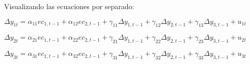 \documentclass[10pt, a4paper, landscape]{article}
\begin{document}
\begin{multicols}{2}
		Visualizando las ecuaciones por separado:
		
		\begin{center}
			$\Delta y_{1t} = \alpha_{11} ec_{1, t - 1} + \alpha_{12} ec_{2, t - 1}  + \gamma_{11} \Delta y_{1, t - 1} + \gamma_{12} \Delta y_{2, t - 1} + \gamma_{13} \Delta y_{3, t - 1} + u_{1t}$
			
			$\Delta y_{2t} = \alpha_{21} ec_{1, t - 1} + \alpha_{22} ec_{2, t - 1}  + \gamma_{21} \Delta y_{1, t - 1} + \gamma_{22} \Delta y_{2, t - 1} + \gamma_{23} \Delta y_{3, t - 1} + u_{2t}$
			
			$\Delta y_{3t} = \alpha_{31} ec_{1, t - 1} + \alpha_{32} ec_{2, t - 1}  + \gamma_{31} \Delta y_{1, t - 1} + \gamma_{32} \Delta y_{2, t - 1} + \gamma_{33} \Delta y_{3, t - 1} + u_{3t}$
		\end{center}
	\end{multicols}
\end{document}
